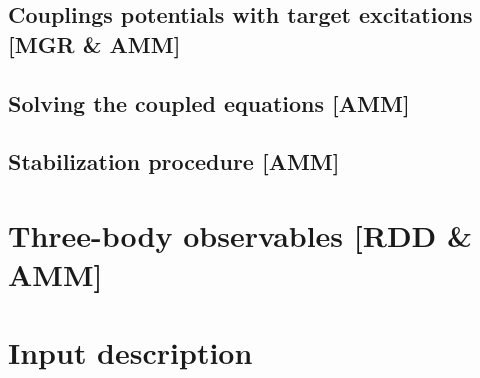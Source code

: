 \documentclass[preprint,12pt]{elsarticle}
\begin{document}
\subsection{Couplings potentials with target excitations [MGR \& AMM] }


\subsection{Solving the coupled equations [AMM]}

\subsection{Stabilization procedure [AMM]}


\section{Three-body observables [RDD \& AMM]}






\section{Input description}
\end{document}
